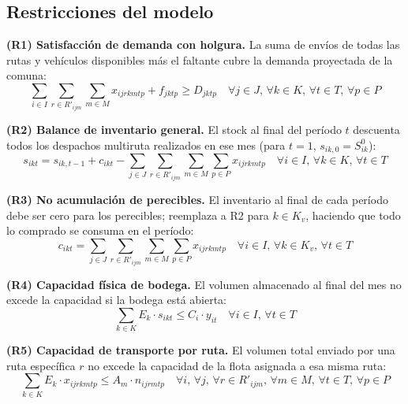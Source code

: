 \documentclass[letterpaper]{article}
\begin{document}
\begin{flushleft}
\subsection{Restricciones del modelo}

\textbf{(R1) Satisfacci\'on de demanda con holgura.} La suma de env\'ios de todas las rutas y veh\'iculos disponibles m\'as el faltante cubre la demanda proyectada de la comuna:
\begin{equation}
\sum_{i \in I} \sum_{r \in R'_{ijm}} \sum_{m \in M} x_{ijrkmtp} + f_{jktp} \geq D_{jktp}
\quad \forall j \in J,\, \forall k \in K,\, \forall t \in T,\, \forall p \in P
\end{equation}

\textbf{(R2) Balance de inventario general.} El stock al final del per\'iodo $t$ descuenta todos los despachos multiruta realizados en ese mes (para $t=1$, $s_{ik,0} = S^0_{ik}$):
\begin{equation}
s_{ikt} = s_{ik,t-1} + c_{ikt} - \sum_{j \in J} \sum_{r \in R'_{ijm}} \sum_{m \in M} \sum_{p \in P} x_{ijrkmtp}
\quad \forall i \in I,\, \forall k \in K,\, \forall t \in T
\end{equation}

\textbf{(R3) No acumulaci\'on de perecibles.} El inventario al final de cada per\'iodo debe ser cero para los perecibles; reemplaza a R2 para $k \in K_v$, haciendo que todo lo comprado se consuma en el per\'iodo:
\begin{equation}
c_{ikt} = \sum_{j \in J} \sum_{r \in R'_{ijm}} \sum_{m \in M} \sum_{p \in P} x_{ijrkmtp}
\quad \forall i \in I,\, \forall k \in K_v,\, \forall t \in T
\end{equation}

\textbf{(R4) Capacidad f\'isica de bodega.} El volumen almacenado al final del mes no excede la capacidad si la bodega est\'a abierta:
\begin{equation}
\sum_{k \in K} E_k \cdot s_{ikt} \leq C_i \cdot y_{it} \quad \forall i \in I,\, \forall t \in T
\end{equation}

\textbf{(R5) Capacidad de transporte por ruta.} El volumen total enviado por una ruta espec\'ifica $r$ no excede la capacidad de la flota asignada a esa misma ruta:
\begin{equation}
\sum_{k \in K} E_k \cdot x_{ijrkmtp} \leq A_m \cdot n_{ijrmtp}
\quad \forall i,\, \forall j,\, \forall r \in R'_{ijm},\, \forall m \in M,\, \forall t \in T,\, \forall p \in P
\end{equation}


\end{flushleft}
\end{document}
